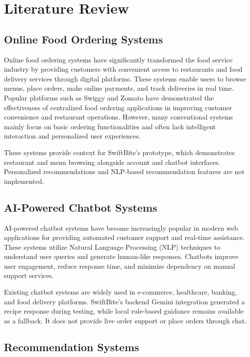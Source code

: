 \chapter{Literature Review}

\section{Online Food Ordering Systems}

Online food ordering systems have significantly transformed the food service industry by providing customers with convenient access to restaurants and food delivery services through digital platforms. These systems enable users to browse menus, place orders, make online payments, and track deliveries in real time. Popular platforms such as Swiggy and Zomato have demonstrated the effectiveness of centralized food ordering applications in improving customer convenience and restaurant operations. However, many conventional systems mainly focus on basic ordering functionalities and often lack intelligent interaction and personalized user experiences.

These systems provide context for SwiftBite's prototype, which demonstrates restaurant and menu browsing alongside account and chatbot interfaces. Personalized recommendations and NLP-based recommendation features are not implemented.

\section{AI-Powered Chatbot Systems}

AI-powered chatbot systems have become increasingly popular in modern web applications for providing automated customer support and real-time assistance. These systems utilize Natural Language Processing (NLP) techniques to understand user queries and generate human-like responses. Chatbots improve user engagement, reduce response time, and minimize dependency on manual support services.

Existing chatbot systems are widely used in e-commerce, healthcare, banking, and food delivery platforms. SwiftBite's backend Gemini integration generated a recipe response during testing, while local rule-based guidance remains available as a fallback. It does not provide live order support or place orders through chat.

\section{Recommendation Systems}


